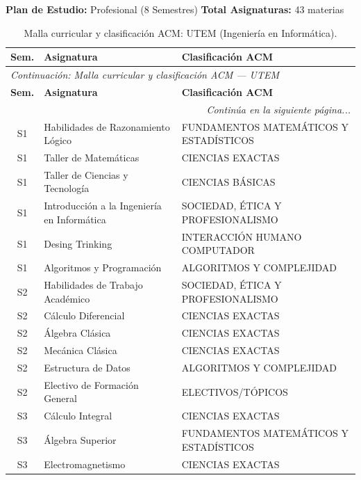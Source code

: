 \documentclass[11pt,a4paper]{article}
\begin{document}
\noindent\textbf{Plan de Estudio:} Profesional (8 Semestres) \hfill \textbf{Total Asignaturas:} 43 materias

\vspace{4pt}

\begin{small}
\begin{longtable}{c >{\raggedright\arraybackslash}p{8.5cm} >{\raggedright\arraybackslash}p{5.5cm}}
\caption{Malla curricular y clasificación ACM: UTEM (Ingeniería en Informática).} \label{tab:UTEM06} \\
\toprule
\textbf{Sem.} & \textbf{Asignatura} & \textbf{Clasificación ACM} \\
\midrule
\endfirsthead
\multicolumn{3}{l}{\small\textit{Continuación: Malla curricular y clasificación ACM --- UTEM}} \\[3pt]
\toprule
\textbf{Sem.} & \textbf{Asignatura} & \textbf{Clasificación ACM} \\
\midrule
\endhead
\midrule
\multicolumn{3}{r}{\small\textit{Continúa en la siguiente página...}} \\
\endfoot
\bottomrule
\endlastfoot
S1 & Habilidades de Razonamiento Lógico & FUNDAMENTOS MATEMÁTICOS Y ESTADÍSTICOS \\
S1 & Taller de Matemáticas & CIENCIAS EXACTAS \\
S1 & Taller de Ciencias y Tecnología & CIENCIAS BÁSICAS \\
S1 & Introducción a la Ingeniería en Informática & SOCIEDAD, ÉTICA Y PROFESIONALISMO \\
S1 & Desing Trinking & INTERACCIÓN HUMANO COMPUTADOR \\
S1 & Algoritmos y Programación & ALGORITMOS Y COMPLEJIDAD \\
S2 & Habilidades de Trabajo Académico & SOCIEDAD, ÉTICA Y PROFESIONALISMO \\
S2 & Cálculo Diferencial & CIENCIAS EXACTAS \\
S2 & Álgebra Clásica & CIENCIAS EXACTAS \\
S2 & Mecánica Clásica & CIENCIAS EXACTAS \\
S2 & Estructura de Datos & ALGORITMOS Y COMPLEJIDAD \\
S2 & Electivo de Formación General & ELECTIVOS/TÓPICOS \\
S3 & Cálculo Integral & CIENCIAS EXACTAS \\
S3 & Álgebra Superior & FUNDAMENTOS MATEMÁTICOS Y ESTADÍSTICOS \\
S3 & Electromagnetismo & CIENCIAS EXACTAS \\

\end{longtable}
\end{small}
\end{document}

